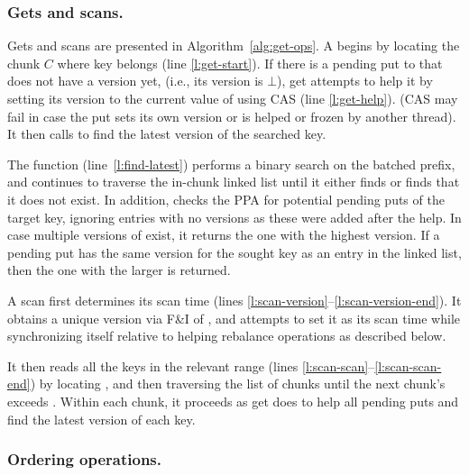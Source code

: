 \subsubsection{Gets and scans.}

Gets and scans are presented in Algorithm~\ref{alg:get-ops}.
A  begins by locating the chunk $C$ where key belongs (line \ref{l:get-start}).
If there is a pending put to  that does not have a version yet, (i.e., its version is $\bot$), get attempts to help it by setting its version to
the current value of  using CAS  (line \ref{l:get-help}). (CAS may fail in case the put sets its own version or is helped or frozen by another thread).
It then calls   to find the latest version of the searched key.

The  function (line~\ref{l:find-latest}) performs a binary search on the batched prefix, and continues to traverse the in-chunk linked list until it either finds   or finds that it does not exist. In addition,  checks the PPA for potential pending puts of the target key,
ignoring entries with no versions as these were added after the help.
In case multiple versions of  exist, it returns the one with the highest version.
If a pending put has the same version for the sought key as an entry in the linked list, then the one with the larger  is returned.

A scan first determines its scan time  (lines \ref{l:scan-version}--\ref{l:scan-version-end}).  It obtains a  unique version via F\&I of ,
and attempts to set it as its scan time while synchronizing itself relative to helping rebalance operations
as described below.

It then reads all the keys in the relevant range (lines \ref{l:scan-scan}--\ref{l:scan-scan-end})
by locating , and then 
traversing the list of chunks  until
the next chunk's  exceeds .
Within each chunk, it proceeds as get does to help all pending puts and find the latest version of each key.

\subsubsection{Ordering operations.}



